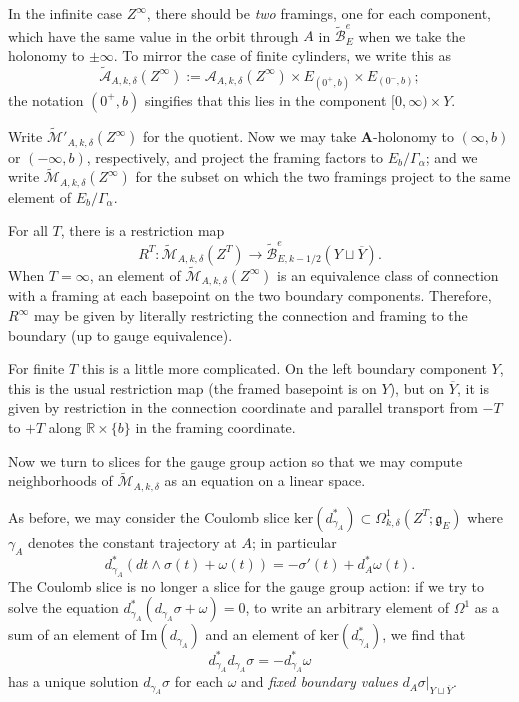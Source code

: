 \documentclass{memo-l}
\theoremstyle{definition}
\theoremstyle{remark}
\numberwithin{section}{chapter}
\numberwithin{equation}{chapter}
\begin{document}
In the infinite case $Z^\infty$, there should be \emph{two} framings, one for each component, which have the same value in the orbit through $A$ in $\widetilde{\mathcal B}^e_E$ when we take the holonomy to $\pm \infty$. To mirror the case of finite cylinders, we write this as $$\widetilde{\mathcal A}_{A,k,\delta}(Z^\infty) := \mathcal A_{A,k,\delta}(Z^\infty) \times E_{(0^+,b)} \times E_{(0^-, b)};$$ the notation $(0^+, b)$ singifies that this lies in the component $[0, \infty) \times Y$.

Write $\widetilde{\mathcal M}'_{A,k,\delta}(Z^\infty)$ for the quotient. Now we may take $\mathbf{A}$-holonomy to $(\infty, b)$ or $(-\infty, b)$, respectively, and project the framing factors to $E_b/\Gamma_\alpha$; and we write $\widetilde{\mathcal M}_{A,k,\delta}(Z^\infty)$ for the subset on which the two framings project to the same element of $E_b/\Gamma_\alpha$.

For all $T$, there is a restriction map $$R^T: \widetilde{\mathcal M}_{A,k,\delta}(Z^T) \to \widetilde{\mathcal B}^e_{E,k-1/2}(Y \sqcup \overline Y).$$ When $T = \infty$, an element of $\widetilde{\mathcal M}_{A,k,\delta}(Z^\infty)$ is an equivalence class of connection with a framing at each basepoint on the two boundary components. Therefore, $R^\infty$ may be given by literally restricting the connection and framing to the boundary (up to gauge equivalence). 

For finite $T$ this is a little more complicated. On the left boundary component $Y$, this is the usual restriction map (the framed basepoint is on $Y$), but on $\overline Y$, it is given by restriction in the connection coordinate and parallel transport from $-T$ to $+ T$ along $\mathbb R \times \{b\}$ in the framing coordinate.

Now we turn to slices for the gauge group action so that we may compute neighborhoods of $\widetilde{\mathcal M}_{A,k,\delta}$ as an equation on a linear space.

As before, we may consider the Coulomb slice $\text{ker}(d_{\gamma_A}^*) \subset \Omega^1_{k,\delta}(Z^T;\mathfrak g_E)$ where $\gamma_A$ denotes the constant trajectory at $A$; in particular $$d_{\gamma_A}^*(dt \wedge \sigma(t) + \omega(t)) = -\sigma'(t) + d_A^* \omega(t).$$ The Coulomb slice is no longer a slice for the gauge group action: if we try to solve the equation $d^*_{\gamma_A}(d_{\gamma_A} \sigma + \omega) = 0$, to write an arbitrary element of $\Omega^1$ as a sum of an element of $\text{Im}(d_{\gamma_A})$ and an element of $\text{ker}(d_{\gamma_A}^*)$, we find that 
$$d_{\gamma_A}^* d_{\gamma_A} \sigma = - d^*_{\gamma_A}\omega$$ 
has a unique solution $d_{\gamma_A} \sigma$ for each $\omega$ and \emph{fixed boundary values} $d_{A} \sigma \big|_{Y \sqcup \overline{Y}}$.
\end{document}
